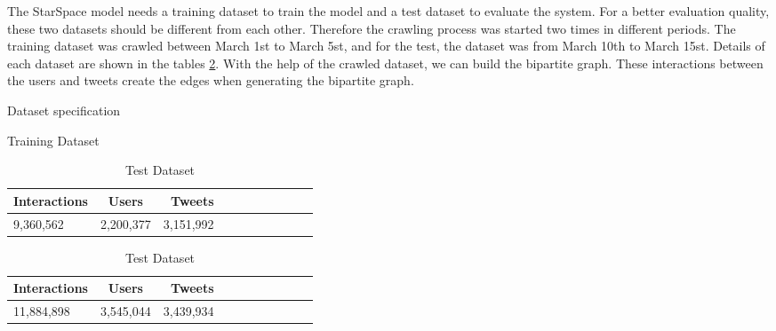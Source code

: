 The StarSpace model needs a training dataset to train the model and a test dataset to evaluate the system. For a better evaluation quality, these two datasets should be different from each other. Therefore the crawling process was started two times in different periods. The training dataset was crawled between March 1st to March 5st, and for the test, the dataset was from March 10th to March 15st. Details of each dataset are shown in the tables \ref{tab:dataset}. With the help of the crawled dataset, we can build the bipartite graph. These interactions between the users and tweets create the edges when generating the bipartite graph.


\begin{table}[!h]
	\caption{Dataset specification}
	\label{tab:dataset}
	\begin{subtable}{.5\linewidth}
		\caption{Training Dataset}
		\centering
        \begin{tabular}{|l|c|r|m{0.4\linewidth}|}
            \hline
            \textbf{Interactions} & \textbf{Users} & \textbf{Tweets} \\
            \hline
            9,360,562 & 2,200,377 & 3,151,992	\\
            \hline
        \end{tabular}
	\end{subtable}%
	\begin{subtable}{.5\linewidth}
		\caption{Test Dataset}
		\centering
        \begin{tabular}{|l|c|r|m{0.4\linewidth}|}
            \hline
            \textbf{Interactions} & \textbf{Users} & \textbf{Tweets} \\
            \hline
            11,884,898 & 3,545,044 & 3,439,934	\\
            \hline
        \end{tabular}
	\end{subtable}%
\end{table}